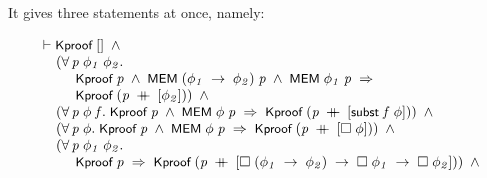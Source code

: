 \documentclass[letterpaper]{article}
\renewcommand{\HOLConst}[1]{{\textsf{\upshape\small #1}}}
\newenvironment{holmath}{\begin{displaymath}\begin{array}{l}}{\end{array}\end{displaymath}\ignorespacesafterend}
\begin{document}
It gives three statements at once, namely:

\begin{holmath}
  \ensuremath{\HOLTokenTurnstile}\HOLConst{Kproof}\;[]\;\HOLSymConst{\HOLTokenConj{}}\\
\;\;\;\;\;(\HOLSymConst{\HOLTokenForall{}}\HOLBoundVar{p}\;\HOLBoundVar{\ensuremath{\phi\sb{1}}}\;\HOLBoundVar{\ensuremath{\phi\sb{2}}}.\\
\;\;\;\;\;\;\;\;\;\;\HOLConst{Kproof}\;\HOLBoundVar{p}\;\HOLSymConst{\HOLTokenConj{}}\;\HOLConst{MEM}\;(\HOLBoundVar{\ensuremath{\phi\sb{1}}}\;\HOLSymConst{\ensuremath{\rightarrow}}\;\HOLBoundVar{\ensuremath{\phi\sb{2}}})\;\HOLBoundVar{p}\;\HOLSymConst{\HOLTokenConj{}}\;\HOLConst{MEM}\;\HOLBoundVar{\ensuremath{\phi\sb{1}}}\;\HOLBoundVar{p}\;\HOLSymConst{\HOLTokenImp{}}\\
\;\;\;\;\;\;\;\;\;\;\HOLConst{Kproof}\;(\HOLBoundVar{p}\;\HOLSymConst{\HOLTokenDoublePlus}\;[\HOLBoundVar{\ensuremath{\phi\sb{2}}}]))\;\HOLSymConst{\HOLTokenConj{}}\\
\;\;\;\;\;(\HOLSymConst{\HOLTokenForall{}}\HOLBoundVar{p}\;\HOLBoundVar{\ensuremath{\phi}}\;\HOLBoundVar{f}.\;\HOLConst{Kproof}\;\HOLBoundVar{p}\;\HOLSymConst{\HOLTokenConj{}}\;\HOLConst{MEM}\;\HOLBoundVar{\ensuremath{\phi}}\;\HOLBoundVar{p}\;\HOLSymConst{\HOLTokenImp{}}\;\HOLConst{Kproof}\;(\HOLBoundVar{p}\;\HOLSymConst{\HOLTokenDoublePlus}\;[\HOLConst{subst}\;\HOLBoundVar{f}\;\HOLBoundVar{\ensuremath{\phi}}]))\;\HOLSymConst{\HOLTokenConj{}}\\
\;\;\;\;\;(\HOLSymConst{\HOLTokenForall{}}\HOLBoundVar{p}\;\HOLBoundVar{\ensuremath{\phi}}.\;\HOLConst{Kproof}\;\HOLBoundVar{p}\;\HOLSymConst{\HOLTokenConj{}}\;\HOLConst{MEM}\;\HOLBoundVar{\ensuremath{\phi}}\;\HOLBoundVar{p}\;\HOLSymConst{\HOLTokenImp{}}\;\HOLConst{Kproof}\;(\HOLBoundVar{p}\;\HOLSymConst{\HOLTokenDoublePlus}\;[\HOLSymConst{\ensuremath{\Box}}\;\HOLBoundVar{\ensuremath{\phi}}]))\;\HOLSymConst{\HOLTokenConj{}}\\
\;\;\;\;\;(\HOLSymConst{\HOLTokenForall{}}\HOLBoundVar{p}\;\HOLBoundVar{\ensuremath{\phi\sb{1}}}\;\HOLBoundVar{\ensuremath{\phi\sb{2}}}.\\
\;\;\;\;\;\;\;\;\;\;\HOLConst{Kproof}\;\HOLBoundVar{p}\;\HOLSymConst{\HOLTokenImp{}}\;\HOLConst{Kproof}\;(\HOLBoundVar{p}\;\HOLSymConst{\HOLTokenDoublePlus}\;[\HOLSymConst{\ensuremath{\Box}}\;(\HOLBoundVar{\ensuremath{\phi\sb{1}}}\;\HOLSymConst{\ensuremath{\rightarrow}}\;\HOLBoundVar{\ensuremath{\phi\sb{2}}})\;\HOLSymConst{\ensuremath{\rightarrow}}\;\HOLSymConst{\ensuremath{\Box}}\;\HOLBoundVar{\ensuremath{\phi\sb{1}}}\;\HOLSymConst{\ensuremath{\rightarrow}}\;\HOLSymConst{\ensuremath{\Box}}\;\HOLBoundVar{\ensuremath{\phi\sb{2}}}]))\;\HOLSymConst{\HOLTokenConj{}}\\

\end{holmath}
\end{document}
